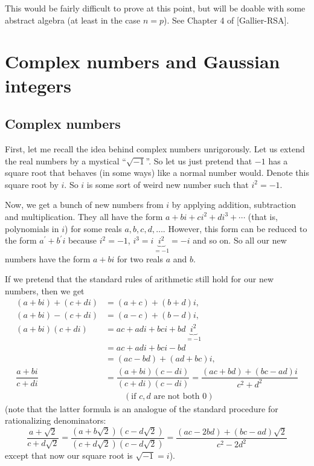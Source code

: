 \documentclass[numbers=enddot,12pt,final,onecolumn,notitlepage]{scrartcl}%
\numberwithin{exer}{subsection}
\theoremstyle{definition}
\begin{document}
This would be fairly difficult to prove at this point, but will be doable with
some abstract algebra (at least in the case $n=p$). See Chapter 4 of [Gallier-RSA].

\section{Complex numbers and Gaussian integers}

\subsection{Complex numbers}

First, let me recall the idea behind complex numbers unrigorously. Let us
extend the real numbers by a mystical \textquotedblleft$\sqrt{-1}%
$\textquotedblright. So let us just pretend that $-1$ has a square root that
behaves (in some ways) like a normal number would. Denote this square root by
$i$. So $i$ is some sort of weird new number such that $i^{2}=-1$.

Now, we get a bunch of new numbers from $i$ by applying addition, subtraction
and multiplication. They all have the form $a+bi+ci^{2}+di^{3}+\cdots$ (that
is, polynomials in $i$) for some reals $a,b,c,d,\ldots$. However, this form
can be reduced to the form $a^{\prime}+b^{\prime}i$ because $i^{2}=-1$,
$i^{3}=i\underbrace{i^{2}}_{=-1}=-i$ and so on. So all our new numbers have
the form $a+bi$ for two reals $a$ and $b$.

If we pretend that the standard rules of arithmetic still hold for our new
numbers, then we get%
\begin{align*}
\left(  a+bi\right)  +\left(  c+di\right)   &  =\left(  a+c\right)  +\left(
b+d\right)  i,\\
\left(  a+bi\right)  -\left(  c+di\right)   &  =\left(  a-c\right)  +\left(
b-d\right)  i,\\
\left(  a+bi\right)  \left(  c+di\right)   &  =ac+adi+bci+bd\underbrace{i^{2}%
}_{=-1}\\
&  =ac+adi+bci-bd\\
&  =\left(  ac-bd\right)  +\left(  ad+bc\right)  i,\\
\dfrac{a+bi}{c+di}  &  =\dfrac{\left(  a+bi\right)  \left(  c-di\right)
}{\left(  c+di\right)  \left(  c-di\right)  }=\dfrac{\left(  ac+bd\right)
+\left(  bc-ad\right)  i}{c^{2}+d^{2}}\\
&  \ \ \ \ \ \ \ \ \ \ \left(  \text{if }c,d\text{ are not both }0\right)
\end{align*}
(note that the latter formula is an analogue of the standard procedure for
rationalizing denominators:%
\[
\dfrac{a+\sqrt{2}}{c+d\sqrt{2}}=\dfrac{\left(  a+b\sqrt{2}\right)  \left(
c-d\sqrt{2}\right)  }{\left(  c+d\sqrt{2}\right)  \left(  c-d\sqrt{2}\right)
}=\dfrac{\left(  ac-2bd\right)  +\left(  bc-ad\right)  \sqrt{2}}{c^{2}-2d^{2}}%
\]
except that now our square root is $\sqrt{-1}=i$).
\end{document}
